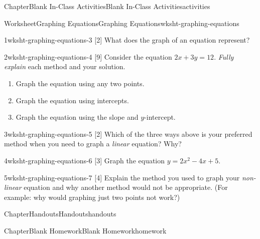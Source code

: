 \documentclass[twoside,14pt,]{extbook}
\begin{document}
\begin{chapterptx}{Chapter}{Blank In-Class Activities}{}{Blank In-Class Activities}{}{}{activities}
\begin{worksheet-section}{Worksheet}{Graphing Equations}{}{Graphing Equations}{}{}{wksht-graphing-equations}
\begin{divisionexercise}{1}{}{}{wksht-graphing-equations-3}
[2] What does the graph of an equation represent?%
\end{divisionexercise}%
\begin{divisionexercise}{2}{}{}{wksht-graphing-equations-4}%
[9] Consider the equation \(2x+3y=12\). \emph{Fully explain} each method and your solution.%
\begin{enumerate}[font=\bfseries,label=(\alph*),ref=\alph*]%
\item{}Graph the equation using any two points.%
\item{}Graph the equation using intercepts.%
\item{}Graph the equation using the slope and \(y\)-intercept.%
\end{enumerate}%
\end{divisionexercise}%
\begin{divisionexercise}{3}{}{}{wksht-graphing-equations-5}%
[2] Which of the three ways above is your preferred method when you need to graph a \emph{linear} equation? Why?%
\end{divisionexercise}%
\begin{divisionexercise}{4}{}{}{wksht-graphing-equations-6}%
[3] Graph the equation \(y = 2x^2 - 4x + 5\).%
\end{divisionexercise}%
\begin{divisionexercise}{5}{}{}{wksht-graphing-equations-7}%
[4] Explain the method you used to graph your \emph{non-linear} equation and why another method would not be appropriate. (For example: why would graphing just two points not work?)%
\end{divisionexercise}%
\end{worksheet-section}
\restoregeometry
\end{chapterptx}
%
%
\typeout{************************************************}
\typeout{************************************************}
%
\begin{chapterptx}{Chapter}{Handouts}{}{Handouts}{}{}{handouts}
\renewcommand*{\chaptername}{Chapter}
\end{chapterptx}
%
%
\typeout{************************************************}
\typeout{************************************************}
%
\begin{chapterptx}{Chapter}{Blank Homework}{}{Blank Homework}{}{}{homework}
\renewcommand*{\chaptername}{Chapter}
\end{chapterptx}
\end{document}
